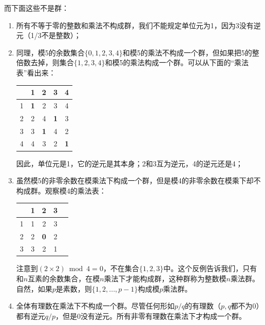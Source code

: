 \documentclass{article}
\begin{document}
而下面这些不是群：

\begin{enumerate}
\item 所有不等于零的整数和乘法不构成群，我们不能规定单位元为1，因为3没有逆元（1/3不是整数）；
\item 同理，模5的余数集合$\{0, 1, 2, 3, 4\}$和模5的乘法不构成一个群，但如果把5的整倍数去掉，则集合$\{1, 2, 3, 4\}$和模5的乘法构成一个群。可以从下面的“乘法表”看出来：

\vspace{5mm}
  \begin{tabular}{c|cccc}
    & 1 & 2 & 3 & 4 \\
  \hline
  1 & \textbf{1} & 2 & 3 & 4 \\
  2 & 2 & 4 & \textbf{1} & 3 \\
  3 & 3 & \textbf{1} & 4 & 2 \\
  4 & 4 & 3 & 2 & \textbf{1}
  \end{tabular}
\vspace{5mm}

因此，单位元是1，它的逆元是其本身；2和3互为逆元，4的逆元还是4；
\item 虽然模5的非零余数在模乘法下构成一个群，但是模4的非零余数在模乘下却不构成群。观察模4的乘法表：

\vspace{5mm}
  \begin{tabular}{c|cccc}
    & 1 & 2 & 3 \\
  \hline
  1 & 1 & 2 & 3 \\
  2 & 2 & \textbf{0} & 2 \\
  3 & 3 & 2 & 1 \\
  \end{tabular}
\vspace{5mm}

注意到$(2 \times 2) \bmod 4 = 0$，不在集合$\{1, 2, 3\}$中。这个反例告诉我们，只有和$n$互素的余数集合，在模$n$乘法下才能构成群，这种群称为整数模$n$乘法群。自然，如果$p$是素数，则$\{1, 2, ..., p-1\}$构成模$p$乘法群。
\item 全体有理数在乘法下不构成一个群。尽管任何形如$p/q$的有理数（$p, q$都不为0）都有逆元$q/p$，但是0没有逆元。所有非零有理数在乘法下才构成一个群。
\end{enumerate}

\begin{Exercise}
\end{Exercise}
\end{document}
